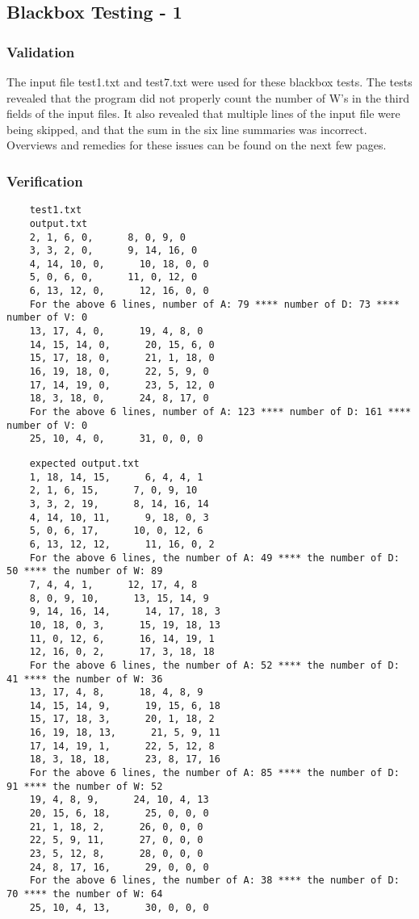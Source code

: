 \documentclass[]{article}
\begin{document}
	\newpage
	

\subsection{Blackbox Testing - 1}
	\subsubsection{Validation}
	The input file test1.txt and test7.txt were used for these blackbox tests.  The
	tests revealed that the program did not properly count the number of W's in the
	third fields of the input files.  It also revealed that multiple lines of the
	input file were being skipped, and that the sum in the six line summaries was
	incorrect.  Overviews and remedies for these issues can be found on the next
	few pages.
	
	\subsubsection{Verification}
	\begin{lstlisting}
	test1.txt
	output.txt
	2, 1, 6, 0,      8, 0, 9, 0
	3, 3, 2, 0,      9, 14, 16, 0
	4, 14, 10, 0,      10, 18, 0, 0
	5, 0, 6, 0,      11, 0, 12, 0
	6, 13, 12, 0,      12, 16, 0, 0
	For the above 6 lines, number of A: 79 **** number of D: 73 **** number of V: 0
	13, 17, 4, 0,      19, 4, 8, 0
	14, 15, 14, 0,      20, 15, 6, 0
	15, 17, 18, 0,      21, 1, 18, 0
	16, 19, 18, 0,      22, 5, 9, 0
	17, 14, 19, 0,      23, 5, 12, 0
	18, 3, 18, 0,      24, 8, 17, 0
	For the above 6 lines, number of A: 123 **** number of D: 161 **** number of V: 0
	25, 10, 4, 0,      31, 0, 0, 0
	\end{lstlisting}
	\begin{lstlisting}
	expected output.txt
	1, 18, 14, 15,      6, 4, 4, 1
	2, 1, 6, 15,      7, 0, 9, 10
	3, 3, 2, 19,      8, 14, 16, 14
	4, 14, 10, 11,      9, 18, 0, 3
	5, 0, 6, 17,      10, 0, 12, 6
	6, 13, 12, 12,      11, 16, 0, 2
	For the above 6 lines, the number of A: 49 **** the number of D: 50 **** the number of W: 89
	7, 4, 4, 1,      12, 17, 4, 8
	8, 0, 9, 10,      13, 15, 14, 9
	9, 14, 16, 14,      14, 17, 18, 3
	10, 18, 0, 3,      15, 19, 18, 13
	11, 0, 12, 6,      16, 14, 19, 1
	12, 16, 0, 2,      17, 3, 18, 18
	For the above 6 lines, the number of A: 52 **** the number of D: 41 **** the number of W: 36
	13, 17, 4, 8,      18, 4, 8, 9
	14, 15, 14, 9,      19, 15, 6, 18
	15, 17, 18, 3,      20, 1, 18, 2
	16, 19, 18, 13,      21, 5, 9, 11
	17, 14, 19, 1,      22, 5, 12, 8
	18, 3, 18, 18,      23, 8, 17, 16
	For the above 6 lines, the number of A: 85 **** the number of D: 91 **** the number of W: 52
	19, 4, 8, 9,      24, 10, 4, 13
	20, 15, 6, 18,      25, 0, 0, 0
	21, 1, 18, 2,      26, 0, 0, 0
	22, 5, 9, 11,      27, 0, 0, 0
	23, 5, 12, 8,      28, 0, 0, 0
	24, 8, 17, 16,      29, 0, 0, 0
	For the above 6 lines, the number of A: 38 **** the number of D: 70 **** the number of W: 64
	25, 10, 4, 13,      30, 0, 0, 0
	\end{lstlisting}
	
\end{document}
